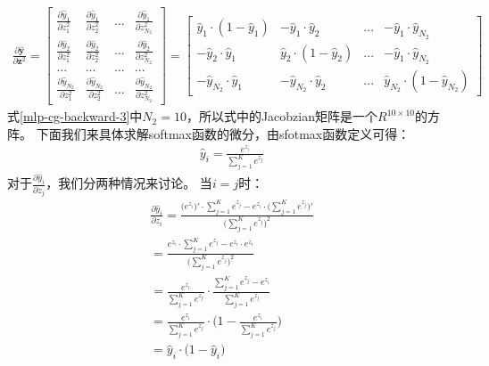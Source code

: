 \documentclass[UTF8]{article}
\begin{document}
\begin{equation}
\begin{aligned}
\frac{\partial{\hat{\boldsymbol{y}}}}{\partial{\boldsymbol{z}^2}}=\begin{bmatrix}
\frac{\partial{\hat{y}_1}}{\partial{z^2_1}} & \frac{\partial{\hat{y}_1}}{\partial{z^2_2}} & ... & \frac{\partial{\hat{y}_1}}{\partial{z^2_{N_2}}} \\ \frac{\partial{\hat{y}_2}}{\partial{z^2_1}} & \frac{\partial{\hat{y}_2}}{\partial{z^2_2}} & ... & \frac{\partial{\hat{y}_2}}{\partial{z^2_{N_2}}} \\
... & ... & ... & ... \\
\frac{\partial{\hat{y}_{N_2}}}{\partial{z^2_1}} & \frac{\partial{\hat{y}_{N_2}}}{\partial{z^2_2}} & ... & \frac{\partial{\hat{y}_{N_2}}}{\partial{z^2_{N_2}}}
\end{bmatrix}=\begin{bmatrix}
\hat{y}_1 \cdot (1-\hat{y}_1) & -\hat{y}_1 \cdot \hat{y}_2 & ... & -\hat{y}_1 \cdot \hat{y}_{N_2} \\
-\hat{y}_2 \cdot \hat{y}_1 & \hat{y}_2 \cdot (1-\hat{y}_2) & ... & -\hat{y}_1 \cdot \hat{y}_{N_2} \\
-\hat{y}_{N_2} \cdot \hat{y}_1 & -\hat{y}_{N_2} \cdot \hat{y}_2 & ... & \hat{y}_{N_2} \cdot (1-\hat{y}_{N_2})
\end{bmatrix}
\end{aligned}
\label{mlp-cg-backward-3}
\end{equation}
式\ref{mlp-cg-backward-3}中$N_2=10$，所以式中的Jacobzian矩阵是一个$R^{10 \times 10}$的方阵。\newline
下面我们来具体求解softmax函数的微分，由sfotmax函数定义可得：
\begin{equation}
\begin{aligned}
\hat{y}_i=\frac{e^{z_i}}{\sum_{j=1}^{K}e^{z_j}}
\end{aligned}
\label{mlp-cg-backward-4}
\end{equation}
对于$\frac{\partial{\hat{y}_i}}{\partial{z_j}}$，我们分两种情况来讨论。\newline
当$i=j$时：
\begin{equation}
\begin{aligned}
\frac{\partial{\hat{y}_i}}{\partial{z_i}}=\frac{\big( e^{z_i} \big)' \cdot \sum_{j=1}^{K}e^{z_j} - e^{z_i} \cdot \big( \sum_{j=1}^{K}e^{z_j} \big)'}{\big( \sum_{j=1}^{K}e^{z_j} \big)^2}\\
=\frac{e^{z_i} \cdot \sum_{j=1}^{K}e^{z_j} - e^{z_i} \cdot e^{z_i}}{\big( \sum_{j=1}^{K}e^{z_j} \big)^2}\\
=\frac{e^{z_i}}{\sum_{j=1}^{K}e^{z_j}} \cdot \frac{\sum_{j=1}^{K}e^{z_j} - e^{z_i}}{\sum_{j=1}^{K}e^{z_j}}\\
=\frac{e^{z_i}}{\sum_{j=1}^{K}e^{z_j}} \cdot \bigg( 1-\frac{e^{z_i}}{\sum_{j=1}^{K}e^{z_j}} \bigg)\\
=\hat{y}_i \cdot \big( 1 - \hat{y}_i \big)
\end{aligned}
\label{mlp-cg-backward-5}
\end{equation}
\end{document}
